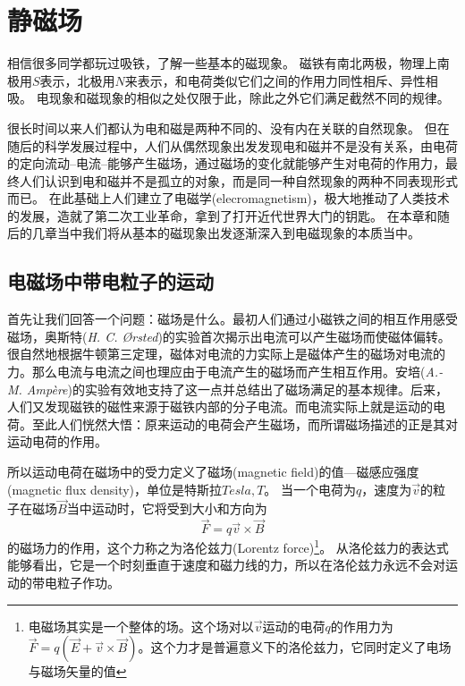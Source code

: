 
\chapter{静磁场}
相信很多同学都玩过吸铁，了解一些基本的磁现象。
磁铁有南北两极，物理上南极用$S$表示，北极用$N$来表示，和电荷类似它们之间的作用力同性相斥、异性相吸。
电现象和磁现象的相似之处仅限于此，除此之外它们满足截然不同的规律。

很长时间以来人们都认为电和磁是两种不同的、没有内在关联的自然现象。
但在随后的科学发展过程中，人们从偶然现象出发发现电和磁并不是没有关系，由电荷的定向流动--电流--能够产生磁场，通过磁场的变化就能够产生对电荷的作用力，最终人们认识到电和磁并不是孤立的对象，而是同一种自然现象的两种不同表现形式而已。
在此基础上人们建立了{\heiti 电磁学}(elecromagnetism)，极大地推动了人类技术的发展，造就了第二次工业革命，拿到了打开近代世界大门的钥匙。
在本章和随后的几章当中我们将从基本的磁现象出发逐渐深入到电磁现象的本质当中。


\section{电磁场中带电粒子的运动}

首先让我们回答一个问题：磁场是什么。最初人们通过小磁铁之间的相互作用感受磁场，奥斯特({\itshape H. C. \O rsted})的实验首次揭示出电流可以产生磁场而使磁体偏转。很自然地根据牛顿第三定理，磁体对电流的力实际上是磁体产生的磁场对电流的力。那么电流与电流之间也理应由于电流产生的磁场而产生相互作用。安培({\itshape A.-M. Amp\`ere})的实验有效地支持了这一点并总结出了磁场满足的基本规律。后来，人们又发现磁铁的磁性来源于磁铁内部的分子电流。而电流实际上就是运动的电荷。至此人们恍然大悟：原来运动的电荷会产生磁场，而所谓磁场描述的正是其对运动电荷的作用。

所以运动电荷在磁场中的受力定义了{\heiti 磁场}(magnetic field)的值---{\heiti 磁感应强度}(magnetic flux density)，单位是特斯拉$\unit{Tesla}, \unit{T}$。
当一个电荷为$q$，速度为$\vec{v}$的粒子在磁场$\vec{B}$当中运动时，它将受到大小和方向为
\begin{equation}\label{eqn: mag-Lorentz-force}
\vec{F} = q \vec{v}\times \vec{B}
\end{equation}
的磁场力的作用，这个力称之为{\heiti 洛伦兹力}(Lorentz force)\footnote{电磁场其实是一个整体的场。这个场对以$\vec{v}$运动的电荷$q$的作用力为$\vec{F}=q(\vec{E}+\vec{v} \times \vec{B})$。这个力才是普遍意义下的洛伦兹力，它同时定义了电场与磁场矢量的值}。
从洛伦兹力的表达式能够看出，它是一个时刻垂直于速度和磁力线的力，所以在洛伦兹力永远不会对运动的带电粒子作功。

